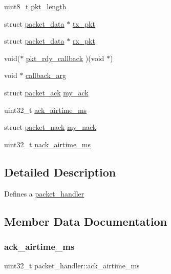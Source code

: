 \begin{DoxyCompactItemize}
\item 
uint8\+\_\+t \mbox{\hyperlink{structpacket__handler_a4292ab96a00dc1506d1cc38fb71fb8d6}{pkt\+\_\+length}}
\item 
struct \mbox{\hyperlink{structpacket__data}{packet\+\_\+data}} $\ast$ \mbox{\hyperlink{structpacket__handler_a99f8392fa43c323721b74248145ef4c1}{tx\+\_\+pkt}}
\item 
struct \mbox{\hyperlink{structpacket__data}{packet\+\_\+data}} $\ast$ \mbox{\hyperlink{structpacket__handler_a96345738c741593283b450e46f843ed5}{rx\+\_\+pkt}}
\item 
void($\ast$ \mbox{\hyperlink{structpacket__handler_aebe312664f54e146c3ebb4dec8371091}{pkt\+\_\+rdy\+\_\+callback}} )(void $\ast$)
\item 
void $\ast$ \mbox{\hyperlink{structpacket__handler_a3fd559111595eaa1fcc500d94ee767b7}{callback\+\_\+arg}}
\item 
struct \mbox{\hyperlink{structpacket__ack}{packet\+\_\+ack}} \mbox{\hyperlink{structpacket__handler_a9a9807acb460e1501faeead198c71f2d}{my\+\_\+ack}}
\item 
uint32\+\_\+t \mbox{\hyperlink{structpacket__handler_a53112d021d2572b745b50d2b4f2a6b5d}{ack\+\_\+airtime\+\_\+ms}}
\item 
struct \mbox{\hyperlink{structpacket__nack}{packet\+\_\+nack}} \mbox{\hyperlink{structpacket__handler_a895701b8c6b074c92ec404167983ff8a}{my\+\_\+nack}}
\item 
uint32\+\_\+t \mbox{\hyperlink{structpacket__handler_a7a309108dc7426e425041b842ef052c7}{nack\+\_\+airtime\+\_\+ms}}
\end{DoxyCompactItemize}


\subsection{Detailed Description}
Defines a \mbox{\hyperlink{structpacket__handler}{packet\+\_\+handler}} 

\subsection{Member Data Documentation}
\mbox{\label{structpacket__handler_a53112d021d2572b745b50d2b4f2a6b5d}} 
\subsubsection{\texorpdfstring{ack\+\_\+airtime\+\_\+ms}{ack\_airtime\_ms}}
{\footnotesize\ttfamily uint32\+\_\+t packet\+\_\+handler\+::ack\+\_\+airtime\+\_\+ms}

